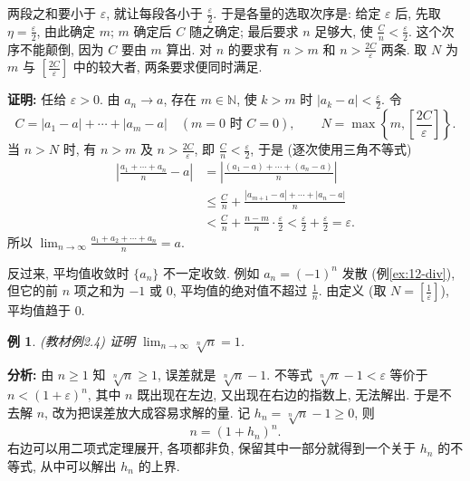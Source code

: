 \documentclass[UTF8,openany]{ctexbook}
\theoremstyle{chinesetextbook}
\newtheorem{example}{例}[section]
\newenvironment{cnproof}{\par\indent\textbf{证明:} \ignorespaces}{\par}
\begin{document}
两段之和要小于 $\varepsilon$, 就让每段各小于 $\displaystyle\frac\varepsilon2$. 于是各量的选取次序是: 给定 $\varepsilon$ 后, 先取 $\displaystyle\eta=\frac\varepsilon2$, 由此确定 $m$; $m$ 确定后 $C$ 随之确定; 最后要求 $n$ 足够大, 使 $\displaystyle\frac Cn<\frac\varepsilon2$. 这个次序不能颠倒, 因为 $C$ 要由 $m$ 算出. 对 $n$ 的要求有 $n>m$ 和 $\displaystyle n>\frac{2C}\varepsilon$ 两条. 取 $N$ 为 $m$ 与 $\displaystyle\left[\frac{2C}\varepsilon\right]$ 中的较大者, 两条要求便同时满足.
\begin{cnproof}
任给 $\varepsilon>0$. 由 $a_n\to a$, 存在 $m\in\mathbb N$, 使 $k>m$ 时 $\displaystyle|a_k-a|<\frac\varepsilon2$. 令
\[
C=|a_1-a|+\cdots+|a_m-a|\quad(m=0\text{ 时 }C=0),\qquad N=\max\left\{m,\left[\frac{2C}\varepsilon\right]\right\}.
\]
当 $n>N$ 时, 有 $n>m$ 及 $\displaystyle n>\frac{2C}\varepsilon$, 即 $\displaystyle\frac Cn<\frac\varepsilon2$, 于是 (逐次使用三角不等式)
\[
\begin{aligned}
\left|\frac{a_1+\cdots+a_n}n-a\right|
&=\left|\frac{(a_1-a)+\cdots+(a_n-a)}n\right|\\
&\le\frac Cn+\frac{|a_{m+1}-a|+\cdots+|a_n-a|}n\\
&<\frac Cn+\frac{n-m}n\cdot\frac\varepsilon2
<\frac\varepsilon2+\frac\varepsilon2=\varepsilon.
\end{aligned}
\]
所以 $\displaystyle\lim_{n\to\infty}\frac{a_1+a_2+\cdots+a_n}n=a$.
\end{cnproof}
反过来, 平均值收敛时 $\{a_n\}$ 不一定收敛. 例如 $a_n=(-1)^n$ 发散 (例\ref{ex:12-div}), 但它的前 $n$ 项之和为 $-1$ 或 $0$, 平均值的绝对值不超过 $\displaystyle\frac1n$. 由定义 (取 $\displaystyle N=\left[\frac1\varepsilon\right]$), 平均值趋于 $0$.
\begin{example}\label{ex:2-4}
\textnormal{(教材例2.4)} 证明 $\displaystyle\lim_{n\to\infty}\sqrt[n]n=1$.
\end{example}
\par\indent\textbf{分析:} 由 $n\ge1$ 知 $\sqrt[n]n\ge1$, 误差就是 $\sqrt[n]n-1$. 不等式 $\sqrt[n]n-1<\varepsilon$ 等价于 $n<(1+\varepsilon)^n$, 其中 $n$ 既出现在左边, 又出现在右边的指数上, 无法解出. 于是不去解 $n$, 改为把误差放大成容易求解的量. 记 $h_n=\sqrt[n]n-1\ge0$, 则
\[
n=(1+h_n)^n.
\]
右边可以用二项式定理展开, 各项都非负, 保留其中一部分就得到一个关于 $h_n$ 的不等式, 从中可以解出 $h_n$ 的上界.
\end{document}

